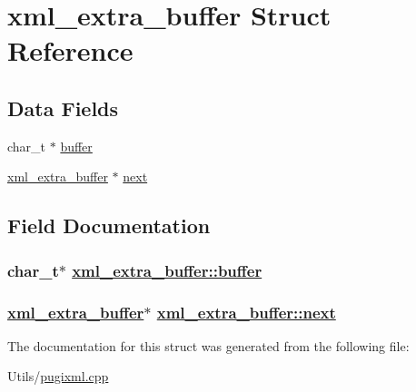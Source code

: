 \hypertarget{structxml__extra__buffer}{
\section{xml\_\-extra\_\-buffer Struct Reference}
\label{structxml__extra__buffer}
}
\subsection*{Data Fields}
\begin{CompactItemize}
\item 
char\_\-t $\ast$ \hyperlink{structxml__extra__buffer_b24b191b25f92ad4d48009978ebee38c}{buffer}
\item 
\hyperlink{structxml__extra__buffer}{xml\_\-extra\_\-buffer} $\ast$ \hyperlink{structxml__extra__buffer_8aaafa90868ca4d8e06b21eeabd96183}{next}
\end{CompactItemize}


\subsection{Field Documentation}
\hypertarget{structxml__extra__buffer_b24b191b25f92ad4d48009978ebee38c}{
\subsubsection[buffer]{\setlength{\rightskip}{0pt plus 5cm}char\_\-t$\ast$ \hyperlink{structxml__extra__buffer_b24b191b25f92ad4d48009978ebee38c}{xml\_\-extra\_\-buffer::buffer}}}
\label{structxml__extra__buffer_b24b191b25f92ad4d48009978ebee38c}


\hypertarget{structxml__extra__buffer_8aaafa90868ca4d8e06b21eeabd96183}{
\subsubsection[next]{\setlength{\rightskip}{0pt plus 5cm}\hyperlink{structxml__extra__buffer}{xml\_\-extra\_\-buffer}$\ast$ \hyperlink{structxml__extra__buffer_8aaafa90868ca4d8e06b21eeabd96183}{xml\_\-extra\_\-buffer::next}}}
\label{structxml__extra__buffer_8aaafa90868ca4d8e06b21eeabd96183}




The documentation for this struct was generated from the following file:\begin{CompactItemize}
\item 
Utils/\hyperlink{pugixml_8cpp}{pugixml.cpp}\end{CompactItemize}
